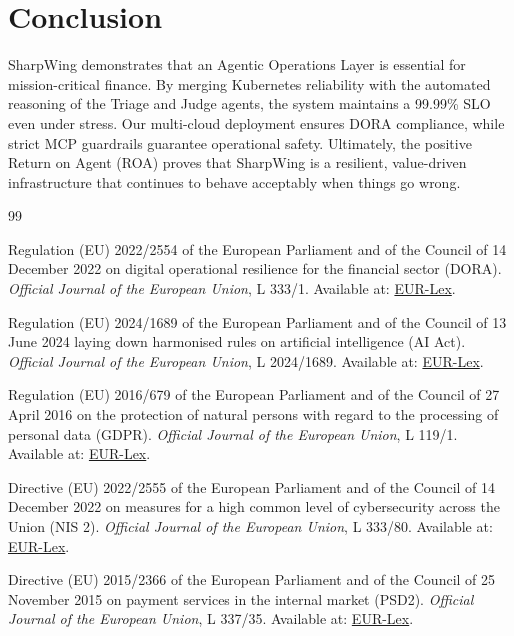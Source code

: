 \documentclass[12pt]{report}
\begin{document}
\section{Conclusion}

SharpWing demonstrates that an Agentic Operations Layer is essential for mission-critical finance. By merging Kubernetes reliability with the automated reasoning of the Triage and Judge agents, the system maintains a 99.99\% SLO even under stress. Our multi-cloud deployment ensures DORA compliance, while strict MCP guardrails guarantee operational safety. Ultimately, the positive Return on Agent (ROA) proves that SharpWing is a resilient, value-driven infrastructure that continues to behave acceptably when things go wrong.

\begin{thebibliography}{99}

Regulation (EU) 2022/2554 of the European Parliament and of the Council of 14 December 2022 on digital operational resilience for the financial sector (DORA). \textit{Official Journal of the European Union}, L 333/1. Available at: \href{https://eur-lex.europa.eu/legal-content/EN/TXT/?uri=CELEX:32022R2554}{EUR-Lex}.

Regulation (EU) 2024/1689 of the European Parliament and of the Council of 13 June 2024 laying down harmonised rules on artificial intelligence (AI Act). \textit{Official Journal of the European Union}, L 2024/1689. Available at: \href{https://eur-lex.europa.eu/legal-content/EN/TXT/?uri=CELEX:32024R1689}{EUR-Lex}.

Regulation (EU) 2016/679 of the European Parliament and of the Council of 27 April 2016 on the protection of natural persons with regard to the processing of personal data (GDPR). \textit{Official Journal of the European Union}, L 119/1. Available at: \href{https://eur-lex.europa.eu/legal-content/EN/TXT/?uri=celex%3A32016R0679}{EUR-Lex}.

Directive (EU) 2022/2555 of the European Parliament and of the Council of 14 December 2022 on measures for a high common level of cybersecurity across the Union (NIS 2). \textit{Official Journal of the European Union}, L 333/80. Available at: \href{https://eur-lex.europa.eu/legal-content/EN/TXT/?uri=CELEX:32022L2555}{EUR-Lex}.

Directive (EU) 2015/2366 of the European Parliament and of the Council of 25 November 2015 on payment services in the internal market (PSD2). \textit{Official Journal of the European Union}, L 337/35. Available at: \href{https://eur-lex.europa.eu/legal-content/EN/TXT/?uri=celex%3A32015L2366}{EUR-Lex}.


\end{thebibliography}
\end{document}
